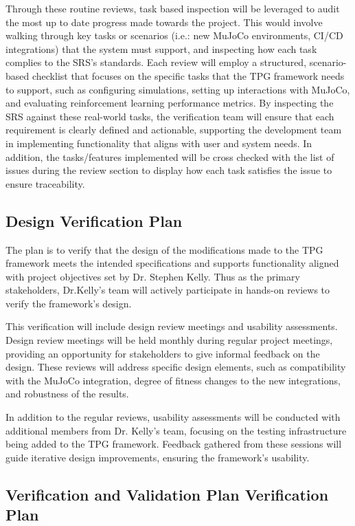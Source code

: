 \documentclass[12pt, titlepage]{article}
\begin{document}
Through these routine reviews, task based inspection will be leveraged to audit the most up to date progress made towards the project. This would involve walking through key tasks or scenarios (i.e.: new MuJoCo environments, CI/CD integrations) that the system must support, and inspecting how each task complies to the SRS’s standards. Each review will employ a structured, scenario-based checklist that focuses on the specific tasks that the TPG framework needs to support, such as configuring simulations, setting up interactions with MuJoCo, and evaluating reinforcement learning performance metrics. By inspecting the SRS against these real-world tasks, the verification team will ensure that each requirement is clearly defined and actionable, supporting the development team in implementing functionality that aligns with user and system needs. In addition, the tasks/features implemented will be cross checked with the list of issues during the review section to display how each task satisfies the issue to ensure traceability.


\subsection{Design Verification Plan}

The plan is to verify that the design of the modifications made to the TPG framework meets the intended specifications and supports functionality aligned with project objectives set by Dr. Stephen Kelly. Thus as the primary stakeholders, Dr.Kelly's team will actively participate in hands-on reviews to verify the framework's design.

This verification will include design review meetings and usability assessments. Design review meetings will be held monthly during regular project meetings, providing an opportunity for stakeholders to give informal feedback on the design. These reviews will address specific design elements, such as compatibility with the MuJoCo integration, degree of fitness changes to the new integrations, and robustness of the results.

In addition to the regular reviews, usability assessments will be conducted with additional members from Dr. Kelly's team, focusing on the testing infrastructure being added to the TPG framework. Feedback gathered from these sessions will guide iterative design improvements, ensuring the framework's usability.


\subsection{Verification and Validation Plan Verification Plan}
\end{document}
